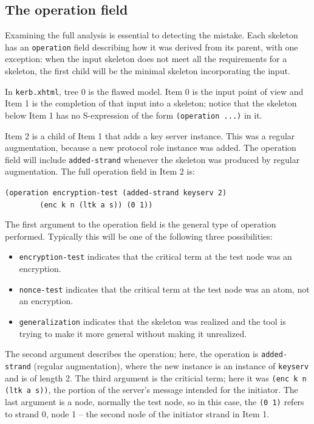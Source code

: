 \subsection{The operation field}
\label{sec:operation}
 Examining the full {\cpsa} analysis is
essential to detecting the mistake.  Each skeleton has an
\texttt{operation} field describing how it was derived from its
parent, with one exception: when the input skeleton does not meet all
the requirements for a skeleton, the first child will be the minimal
skeleton incorporating the input.

In \texttt{kerb.xhtml}, tree 0 is the flawed model.  Item 0 is the input
point of view and Item 1 is the completion of that input into a
skeleton; notice that the skeleton below Item 1 has no S-expression of
the form \texttt{(operation ...)} in it.

 Item 2 is a child of Item 1 that adds a key
server instance.  This was a regular augmentation, because a new
protocol role instance was added.  The operation field will include
\texttt{added-strand} whenever the skeleton was produced by regular
augmentation.  The full operation field in Item 2 is:

\begin{center}
\verb|(operation encryption-test (added-strand keyserv 2)|\\
\verb|        (enc k n (ltk a s)) (0 1))|
\end{center}

The first argument to the operation field is the general type of
operation performed.  Typically this will be one of the following
three possibilities:

\begin{itemize}
\item \texttt{encryption-test} indicates that the critical term at the
  test node was an encryption.
\item \texttt{nonce-test} indicates that the critical term at the test
  node was an atom, not an encryption.
\item \texttt{generalization} indicates that the skeleton was realized
  and the tool is trying to make it more general without making it
  unrealized.
\end{itemize}

The second argument describes the operation; here, the operation is
\texttt{added-strand} (regular augmentation), where the new instance
is an instance of \texttt{keyserv} and is of length 2.  The third
argument is the criticial term; here it was \texttt{(enc k n (ltk a s))},
the portion of the server's message intended for the initiator.  The
last argument is a node, normally the test node, so in this case, the
\texttt{(0 1)} refers to strand 0, node 1 -- the second node of the
initiator strand in Item 1.

